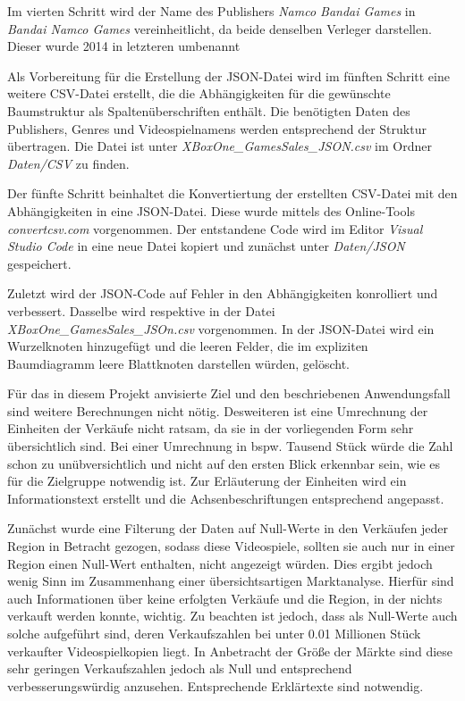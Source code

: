 \documentclass[usegeometry=true]{scrartcl}
\begin{document}
Im vierten Schritt wird der Name des Publishers \textit{Namco Bandai Games} in \textit{Bandai Namco Games} vereinheitlicht, da beide denselben Verleger darstellen. Dieser wurde 2014 in letzteren umbenannt

Als Vorbereitung für die Erstellung der JSON-Datei wird im fünften Schritt eine weitere CSV-Datei erstellt, die die Abhängigkeiten für die gewünschte Baumstruktur als Spaltenüberschriften enthält. 
Die benötigten Daten des Publishers, Genres und Videospielnamens werden entsprechend der Struktur übertragen. Die Datei ist unter \textit{XBoxOne_GamesSales_JSON.csv} im Ordner \textit{Daten/CSV} zu finden.

Der fünfte Schritt beinhaltet die Konvertiertung der erstellten CSV-Datei mit den Abhängigkeiten in eine JSON-Datei. Diese wurde mittels des Online-Tools \textit{convertcsv.com} vorgenommen. %
Der entstandene Code wird im Editor \textit{Visual Studio Code} in eine neue Datei kopiert und zunächst unter \textit{Daten/JSON} gespeichert.

Zuletzt wird der JSON-Code auf Fehler in den Abhängigkeiten konrolliert und verbessert. Dasselbe wird respektive in der Datei \textit{XBoxOne_GamesSales_JSOn.csv} vorgenommen. 
In der JSON-Datei wird ein Wurzelknoten hinzugefügt und die leeren Felder, die im expliziten Baumdiagramm leere Blattknoten darstellen würden, gelöscht.

Für das in diesem Projekt anvisierte Ziel und den beschriebenen Anwendungsfall sind weitere Berechnungen nicht nötig. %
Desweiteren ist eine Umrechnung der Einheiten der Verkäufe nicht ratsam, da sie in der vorliegenden Form sehr übersichtlich sind. 
Bei einer Umrechnung in bspw. Tausend Stück würde die Zahl schon zu unübversichtlich und nicht auf den ersten Blick erkennbar sein, wie es für die Zielgruppe notwendig ist. Zur Erläuterung der Einheiten wird ein Informationstext erstellt und die Achsenbeschriftungen entsprechend angepasst.

Zunächst wurde eine Filterung der Daten auf Null-Werte in den Verkäufen jeder Region in Betracht gezogen, sodass diese Videospiele, sollten sie auch nur in einer Region einen Null-Wert enthalten, nicht angezeigt würden. 
Dies ergibt jedoch wenig Sinn im Zusammenhang einer übersichtsartigen Marktanalyse. Hierfür sind auch Informationen über keine erfolgten Verkäufe und die Region, in der nichts verkauft werden konnte, wichtig. 
Zu beachten ist jedoch, dass als Null-Werte auch solche aufgeführt sind, deren Verkaufszahlen bei unter 0.01 Millionen Stück verkaufter Videospielkopien liegt. In Anbetracht der Größe der Märkte sind diese sehr geringen Verkaufszahlen jedoch als Null und entsprechend verbesserungswürdig anzusehen.
Entsprechende Erklärtexte sind notwendig.
\end{document}
